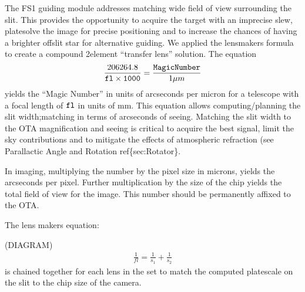 \documentclass[letterpaper,10pt,english,openany,oneside]{sphinxmanual}
\begin{document}
\sphinxAtStartPar
The FS1 guiding module addresses matching wide field of view
surrounding the slit. This provides the opportunity to acquire the
target with an imprecise slew, plate\sphinxhyphen{}solve the image for precise
positioning and to increase the chances of having a brighter off\sphinxhyphen{}slit
star for alternative guiding. We applied the lens\sphinxhyphen{}makers formula to
create a compound 2\sphinxhyphen{}element “transfer lens” solution.  The equation
\begin{equation*}
\begin{split}\frac{206264.8}{\tt{fl}\times 1000} = \frac{\tt{Magic Number}}{1 \mu{m}}\end{split}
\end{equation*}
\sphinxAtStartPar
yields the “Magic Number” in units of arc\sphinxhyphen{}seconds per micron for a
telescope with a focal length of \({\tt{fl}}\) in units of mm. This
equation allows computing/planning the slit width;matching in terms of
arc\sphinxhyphen{}seconds of seeing. Matching the slit width to the OTA magnification
and seeing is critical to acquire the best signal, limit the sky
contributions and to mitigate the effects of atmospheric refraction
(see Parallactic Angle and Rotation ref\{sec:Rotator\}.

\sphinxAtStartPar
In imaging, multiplying the number by the pixel size in microns,
yields the arc\sphinxhyphen{}seconds per pixel. Further multiplication by the size of
the chip yields the total field of view for the image. This number
should be permanently affixed to the OTA.

\ignorespaces 
\sphinxAtStartPar
The lens makers equation:

\sphinxAtStartPar
(DIAGRAM)
\begin{equation*}
\begin{split}\frac{1}{fl} = \frac{1}{s_{1}} + \frac{1}{s_{2}} \label{E:LensMakersEquation}\end{split}
\end{equation*}
\sphinxAtStartPar
is chained together for each lens in the set to match the computed
platescale on the slit to the chip size of the camera.
\end{document}
